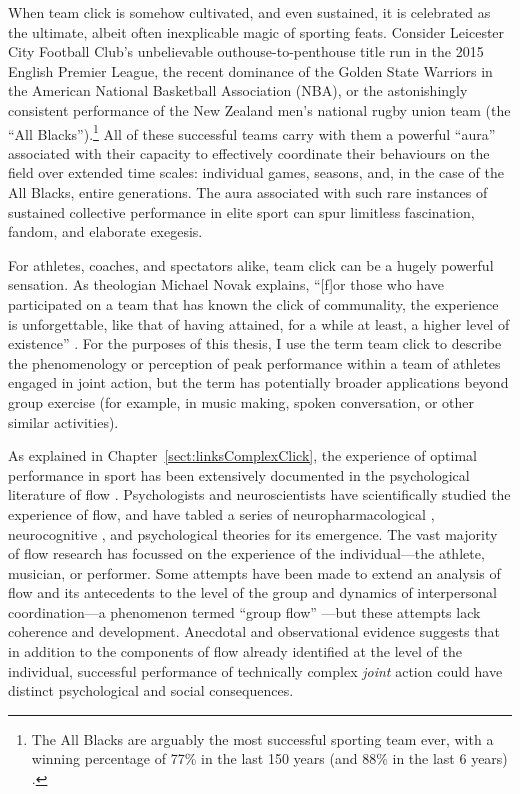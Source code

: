 \begin{CJK}{UTF8}{gbsn}
When team click is somehow cultivated, and even sustained, it is celebrated as the ultimate, albeit often inexplicable magic of sporting feats. Consider Leicester City Football Club's unbelievable outhouse-to-penthouse title run in the 2015 English Premier League, the recent dominance of the Golden State Warriors in the American National Basketball Association (NBA), or the astonishingly consistent performance of the New Zealand men's national rugby union team (the ``All Blacks'').\footnote{The All Blacks are arguably the most successful sporting team ever, with a winning percentage of 77\% in the last 150 years (and 88\% in the last 6 years) \citep{Kerr2013}.} All of these successful teams carry with them a powerful ``aura'' associated with their capacity to effectively coordinate their behaviours on the field over extended time scales: individual games, seasons, and, in the case of the All Blacks, entire generations.  The aura associated with such rare instances of sustained collective performance in elite sport can spur limitless fascination, fandom, and elaborate exegesis.


For athletes, coaches, and spectators alike, team click can be a hugely powerful sensation.  As theologian Michael Novak explains, ``[f]or those who have participated on a team that has known the click of communality, the experience is unforgettable, like that of having attained, for a while at least, a higher level of existence'' \citep[11]{White2011}. For the purposes of this thesis, I use the term team click to describe the phenomenology or perception of peak performance within a team of athletes engaged in joint action, but the term has potentially broader applications beyond group exercise (for example, in music making, spoken conversation, or other similar activities).

As explained in Chapter~\ref{sect:linksComplexClick}, the experience of optimal performance in sport has been extensively documented in the psychological literature of flow \citep{Csikszentmihalyi1992,Jackson1995,Jackson1999,McNeill1995}.  Psychologists and neuroscientists have scientifically studied the experience of flow, and have tabled a series of neuropharmacological \citep{Boecker2008}, neurocognitive \citep{Dietrich2006,Dietrich2011,Labelle2013}, and psychological \citep{Csikszentmihalyi1992} theories for its emergence.  The vast majority of flow research has focussed on the experience of the individual---the athlete, musician, or performer.  Some attempts have been made to extend an analysis of flow and its antecedents to the level of the group and dynamics of interpersonal coordination---a phenomenon termed ``group flow'' \citep{Sawyer2006}---but these attempts lack coherence and development.  Anecdotal and observational evidence suggests that in addition to the components of flow already identified at the level of the individual, successful performance of technically complex
\textit{joint} action could have distinct psychological and social consequences.


\end{CJK}
